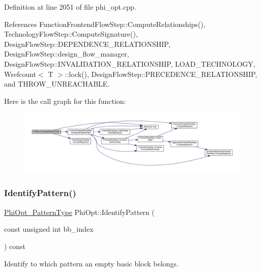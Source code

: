 Definition at line 2051 of file phi\+\_\+opt.\+cpp.



References Function\+Frontend\+Flow\+Step\+::\+Compute\+Relationships(), Technology\+Flow\+Step\+::\+Compute\+Signature(), Design\+Flow\+Step\+::\+D\+E\+P\+E\+N\+D\+E\+N\+C\+E\+\_\+\+R\+E\+L\+A\+T\+I\+O\+N\+S\+H\+IP, Design\+Flow\+Step\+::design\+\_\+flow\+\_\+manager, Design\+Flow\+Step\+::\+I\+N\+V\+A\+L\+I\+D\+A\+T\+I\+O\+N\+\_\+\+R\+E\+L\+A\+T\+I\+O\+N\+S\+H\+IP, L\+O\+A\+D\+\_\+\+T\+E\+C\+H\+N\+O\+L\+O\+GY, Wrefcount$<$ T $>$\+::lock(), Design\+Flow\+Step\+::\+P\+R\+E\+C\+E\+D\+E\+N\+C\+E\+\_\+\+R\+E\+L\+A\+T\+I\+O\+N\+S\+H\+IP, and T\+H\+R\+O\+W\+\_\+\+U\+N\+R\+E\+A\+C\+H\+A\+B\+LE.

Here is the call graph for this function\+:
\nopagebreak
\begin{figure}[H]
\begin{center}
\leavevmode
\includegraphics[width=350pt]{dc/ddf/classPhiOpt_ae9fa634dbb3dfb91ff7928cc8e48be1c_cgraph}
\end{center}
\end{figure}
\mbox{\label{classPhiOpt_a152f18a024bdfc6164aed9ad0cafe910}} 
\subsubsection{\texorpdfstring{Identify\+Pattern()}{IdentifyPattern()}}
{\footnotesize\ttfamily \hyperlink{phi__opt_8hpp_a56025cfe3e431d463931162e2d771f77}{Phi\+Opt\+\_\+\+Pattern\+Type} Phi\+Opt\+::\+Identify\+Pattern (\begin{DoxyParamCaption}\item[{const unsigned int}]{bb\+\_\+index }\end{DoxyParamCaption}) const\hspace{0.3cm}{\ttfamily [private]}}



Identify to which pattern an empty basic block belongs. 


